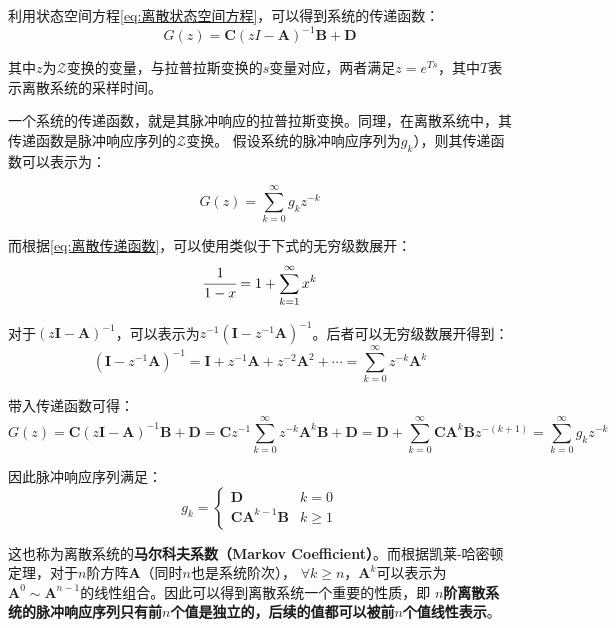 利用状态空间方程\ref{eq:离散状态空间方程}，可以得到系统的传递函数：
\begin{equation}
    G(z)=\bm{C}(zI-\bm{A})^{-1}\bm{B}+\bm{D}
    \label{eq:离散传递函数}
\end{equation}

其中\(z\)为\(\mathcal{Z}\)变换的变量，与拉普拉斯变换的\(s\)变量对应，两者满足\(z=e^{Ts}\)，其中\(T\)表示离散系统的采样时间。

一个系统的传递函数，就是其脉冲响应的拉普拉斯变换。同理，在离散系统中，其传递函数是脉冲响应序列的\(\mathcal{Z}\)变换。
假设系统的脉冲响应序列为\(g_{k}\)），则其传递函数可以表示为：

\begin{equation*}
    G(z)=\sum_{k=0}^{\infty}g_{k}z^{-k}
\end{equation*}

而根据\ref{eq:离散传递函数}，可以使用类似于下式的无穷级数展开：
\begin{equation*}
    \cfrac{1}{1-x}=1+\sum_{k=1}^{\infty}x^k
\end{equation*}

对于\((z\bm{I}-\bm{A})^{-1}\)，可以表示为\(z^{-1}(\bm{I}-z^{-1}\bm{A})^{-1}\)。后者可以无穷级数展开得到：
\begin{equation*}
    (\bm{I}-z^{-1}\bm{A})^{-1} =\bm{I}+z^{-1}\bm{A}+z^{-2}\bm{A}^2+\cdots=\sum_{k=0}^{\infty}z^{-k}\bm{A}^k
\end{equation*}

带入传递函数可得：
\begin{equation*}
    G(z)=\bm{C}(z\bm{I}-\bm{A})^{-1}\bm{B}+\bm{D}=
    \bm{C}z^{-1}\sum_{k=0}^{\infty}z^{-k}\bm{A}^k\bm{B}+\bm{D}=
    \bm{D}+\sum_{k=0}^{\infty}\bm{C}\bm{A}^k\bm{B}z^{-(k+1)}=\sum_{k=0}^{\infty}g_{k}z^{-k}
\end{equation*}

因此脉冲响应序列满足：
\begin{equation}
    g_{k} = 
    \begin{cases}
        \bm{D} & k=0 \\
        \bm{C}\bm{A}^{k-1}\bm{B} & k\ge 1
    \end{cases}
    \label{eq:脉冲响应序列}
\end{equation}

这也称为离散系统的\textbf{马尔科夫系数（Markov Coefficient）}。而根据凯莱-哈密顿定理，对于\(n\)阶方阵\(\bm{A}\)（同时\(n\)也是系统阶次），
\(\forall k\ge n\)，\(\bm{A}^k\)可以表示为\(\bm{A}^0\sim \bm{A}^{n-1}\)的线性组合。因此可以得到离散系统一个重要的性质，即
\textbf{\(n\)阶离散系统的脉冲响应序列只有前\(n\)个值是独立的，后续的值都可以被前\(n\)个值线性表示}。

